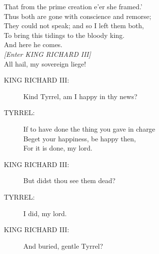 \documentclass{article}
\begin{document}
\begin{description}
\hspace{1pt}That from the prime creation e'er she framed.'\\
\hspace{1pt}Thus both are gone with conscience and remorse;\\
\hspace{1pt}They could not speak; and so I left them both,\\
\hspace{1pt}To bring this tidings to the bloody king.\\
\hspace{1pt}And here he comes.\\
{\it [Enter KING RICHARD III]}\\
\hspace{1pt}All hail, my sovereign liege!\\
\end{description}
\begin{description}
\item[KING RICHARD III:] 
\hspace{1pt}Kind Tyrrel, am I happy in thy news?\\
\end{description}
\begin{description}
\item[TYRREL:] 
\hspace{1pt}If to have done the thing you gave in charge\\
\hspace{1pt}Beget your happiness, be happy then,\\
\hspace{1pt}For it is done, my lord.\\
\end{description}
\begin{description}
\item[KING RICHARD III:] 
\hspace{1pt}But didst thou see them dead?\\
\end{description}
\begin{description}
\item[TYRREL:] 
\hspace{1pt}I did, my lord.\\
\end{description}
\begin{description}
\item[KING RICHARD III:] 
\hspace{1pt}And buried, gentle Tyrrel?\\
\end{description}
\end{document}

